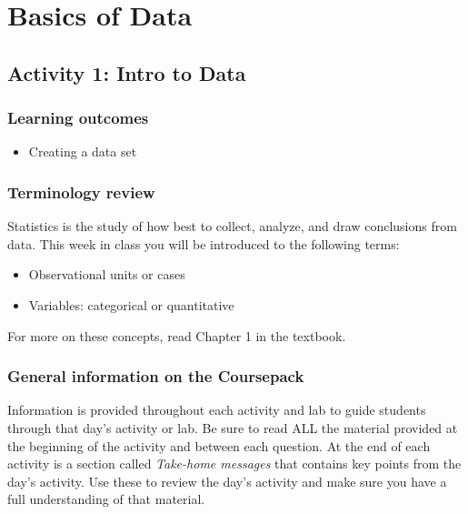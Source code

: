 \documentclass[
]{report}
\providecommand{\tightlist}{%
  \setlength{\itemsep}{0pt}\setlength{\parskip}{0pt}}
\begin{document}
\nocite{*}

\hypertarget{basics-of-data}{%
\chapter{Basics of Data}\label{basics-of-data}}

\hypertarget{activity-1-intro-to-data}{%
\section{Activity 1: Intro to Data}\label{activity-1-intro-to-data}}


\hypertarget{learning-outcomes}{%
\subsection{Learning outcomes}\label{learning-outcomes}}

\begin{itemize}
\tightlist
\item
  Creating a data set
\end{itemize}

\hypertarget{terminology-review}{%
\subsection{Terminology review}\label{terminology-review}}

Statistics is the study of how best to collect, analyze, and draw conclusions from data. This week in class you will be introduced to the following terms:

\begin{itemize}
\item
  Observational units or cases
\item
  Variables: categorical or quantitative
\end{itemize}

For more on these concepts, read Chapter 1 in the textbook.

\hypertarget{general-information-on-the-coursepack}{%
\subsection{General information on the Coursepack}\label{general-information-on-the-coursepack}}

Information is provided throughout each activity and lab to guide students through that day's activity or lab. Be sure to read ALL the material provided at the beginning of the activity and between each question. At the end of each activity is a section called \emph{Take-home messages} that contains key points from the day's activity. Use these to review the day's activity and make sure you have a full understanding of that material.
\end{document}
